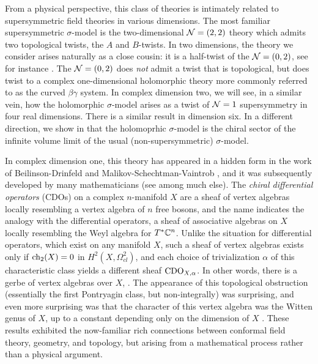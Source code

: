 From a physical perspective, this class of theories is intimately related to supersymmetric field theories in various dimensions.
The most familiar supersymmetric $\sigma$-model is the two-dimensional $\mathcal N=(2,2)$ theory which admits two topological twists, the $A$ and $B$-twists.
In two dimensions, the theory we consider arises naturally as a close cousin: it is a half-twist of the $\mathcal N = (0,2)$, see for instance \cite{WittenCDO}.
The $\mathcal N = (0,2)$ does {\em not} admit a twist that is topological, but does twist to a complex one-dimensional holomorphic theory more commonly referred to as the curved $\beta\gamma$ system.
In complex dimension two, we will see, in a similar vein, how the holomorphic $\sigma$-model arises as a twist of $\mathcal N = 1$ supersymmetry in four real dimensions. 
There is a similar result in dimension six.
In a different direction, we show in \cite{GGW} that the holomoprhic $\sigma$-model is the chiral sector of the infinite volume limit of the usual (non-supersymmetric) $\sigma$-model. 

In complex dimension one, this theory has appeared in a hidden form in the work of Beilinson-Drinfeld and Malikov-Schechtman-Vaintrob \cite{BD,MSV}, and it was subsequently developed by many mathematicians (see \cite{KV,Cheung,Bressler} among much else). The {\em chiral differential operators} (CDOs) on a complex $n$-manifold $X$ are a sheaf of vertex algebras locally resembling a vertex algebra of $n$ free bosons, and the name indicates the analogy with the differential operators, a sheaf of associative algebras on $X$ locally resembling the Weyl algebra for $T^*\mathbb C^n$. Unlike the situation for differential operators, which exist on any manifold $X$, such a sheaf of vertex algebras exists only if ${\rm ch}_2(X) = 0$ in $H^2(X, \Omega^2_{cl})$, and each choice of trivialization $\alpha$ of this characteristic class yields a different sheaf ${\rm CDO}_{X,\alpha}$. In other words, there is a gerbe of vertex algebras over $X$, \cite{GMS}. The appearance of this topological obstruction (essentially the first Pontryagin class, but non-integrally) was surprising, and even more surprising was that the character of this vertex algebra was the Witten genus of $X$, up to a constant depending only on the dimension of $X$ \cite{BorLib}. These results exhibited the now-familiar rich connections between conformal field theory, geometry, and topology, but arising from a mathematical process rather than a physical argument. 

